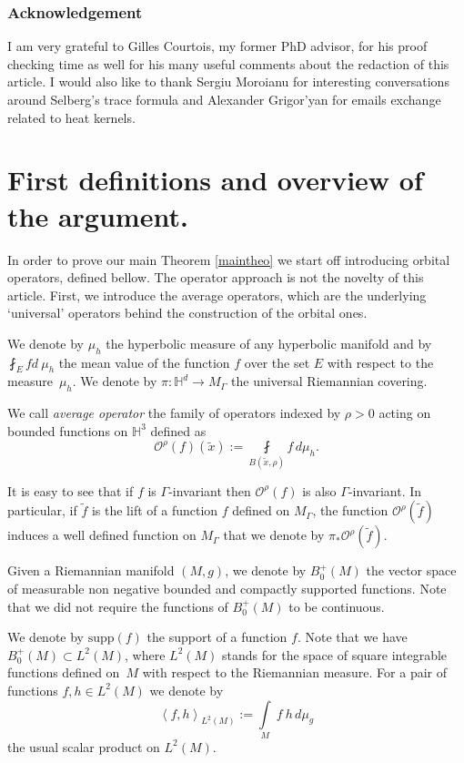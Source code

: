 \documentclass[10pt]{amsart}
\let\mathcal\mathscr
\theoremstyle{plain}
\theoremstyle{definition}
\newcommand{\HH}{\mathbb{H}}
\newcommand{\inte}[1]{\underset{#1}{\int}}
\newcommand{\finte}[3]{\underset{#1}{\fint} {#2} \, {#3}}
\newcommand{\supp}[1]{\mathrm{supp}(#1)}
\begin{document}
\subsubsection*{Acknowledgement} I am very grateful to Gilles Courtois, my former PhD advisor, for his proof checking time as well for his many useful comments about the redaction of this article. I would also like to thank Sergiu Moroianu for interesting conversations around Selberg's trace formula and Alexander Grigor'yan for emails exchange related to heat kernels.

\section{First definitions and overview of the argument.}
\label{secoverview}
In order to prove our main Theorem \ref{maintheo} we start off introducing orbital operators, defined bellow. The operator approach is not the novelty of this article. First, we introduce the average operators, which are the underlying `universal' operators behind the construction of the orbital ones.

We denote by $\mu_h$ the hyperbolic measure of any hyperbolic manifold and by $\fint_{E} f d \ \mu_h $ the mean value of the function $f$ over the set $E$ with respect to the measure~$\mu_h$. We denote by $\pi : \HH^d \to M_{\Gamma}$ the universal Riemannian covering.

We call \emph{average operator} the family of operators indexed by $\rho > 0$ acting on bounded functions on $\HH^3$ defined as
\[
\mathcal{O}^{\rho}(f)(\tilde{x}) := \finte{B(\tilde{x},\rho)}{f}{ d \mu_h}.
\]

It is easy to see that if $f$ is $\Gamma$-invariant then $\mathcal{O}^{\rho}(f)$ is also $\Gamma$-invariant. In particular, if $\tilde{f}$ is the lift of a function $f$ defined on $M_{\Gamma}$, the function $\mathcal{O}^{\rho}(\tilde{f})$ induces a well defined function on $M_{\Gamma}$ that we denote by $\pi_*\mathcal{O}^{\rho}(\tilde{f})$.

Given a Riemannian manifold $(M,g)$, we denote by $B^+_0(M)$ the vector space of measurable non negative bounded and compactly supported functions. Note that we did not require the functions of $B^+_0(M)$ to be continuous.

We denote by $\supp{f}$ the support of a function $f$. Note that we have $B^+_0(M) \subset L^2(M)$, where $L^2(M)$ stands for the space of square integrable functions defined on~$M$ with respect to the Riemannian measure. For a pair of functions $f,h \in L^2(M)$ we denote by
\[
\left<f,h \right>_{L^2(M)} := \inte{M} \ f \ h \,d\mu_g
\]
the usual scalar product on $L^2(M)$.
\end{document}
